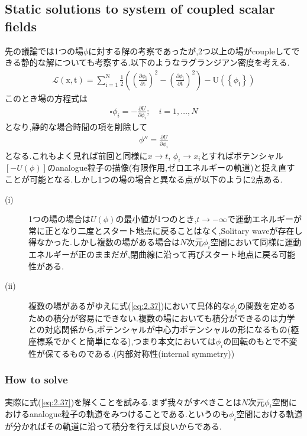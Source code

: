 \documentclass[dvipdfmx,11pt,a4paper,oneside,openany]{jsbook}
\begin{document}
\subsection{Static solutions to system of coupled scalar fields}
先の議論では1つの場$\phi$に対する解の考察であったが,2つ以上の場がcoupleしてできる静的な解についても考察する.以下のようなラグランジアン密度を考える.
\begin{align}
    \mathscr{L}(\mathrm{x}, \mathrm{t})=\sum_{\mathrm{i}=1}^{\mathrm{N}} \frac{1}{2}\left(\left(\frac{\partial \phi_{\mathrm{i}}}{\partial \mathrm{t}}\right)^{2}-\left(\frac{\partial \phi_{\mathrm{i}}}{\partial \mathrm{t}}\right)^{2}\right)-\mathrm{U}\left(\left\{\phi_{\mathrm{i}}\right\}\right)
\end{align}
このとき場の方程式は
\begin{align}
    \square \phi_{i}=-\frac{\partial U}{\partial \phi_{i}} ; \quad i=1, \ldots, N
\end{align}
となり,静的な場合時間の項を削除して
\begin{align}
    \phi''=\frac{\partial U}{\partial\phi_i}\label{eq:2.37}
\end{align}
となる.これもよく見れば前回と同様に$x\rightarrow t$, $\phi_i\rightarrow x_i$とすればポテンシャル$[-U(\phi)]$のanalogue粒子の描像(有限作用,ゼロエネルギーの軌道)と捉え直すことが可能となる.しかし1つの場の場合と異なる点が以下のように2点ある.
\begin{description}
    \item[(i)] 1つの場の場合は$U(\phi)$の最小値が1つのとき,$t\rightarrow -\infty$で運動エネルギーが常に正となり二度とスタート地点に戻ることはなく,Solitary waveが存在し得なかった.しかし複数の場がある場合は$N$次元$\phi_i$空間において同様に運動エネルギーが正のままだが,閉曲線に沿って再びスタート地点に戻る可能性がある.
    \item[(ii)] 複数の場があるがゆえに式(\ref{eq:2.37})において具体的な$\phi_i$の関数を定めるための積分が容易にできない.複数の場においても積分ができるのは力学との対応関係から,ポテンシャルが中心力ポテンシャルの形になるもの(極座標系でかくと簡単になる),つまり本文においては$\phi_i$の回転のもとで不変性が保てるものである.(内部対称性(internal symmetry))
\end{description}

\subsubsection{How to solve}
実際に式(\ref{eq:2.37})を解くことを試みる.まず我々がすべきことは$N$次元$\phi_i$空間におけるanalogue粒子の軌道をみつけることである.というのも$\phi_i$空間における軌道が分かればその軌道に沿って積分を行えば良いからである.
\end{document}
